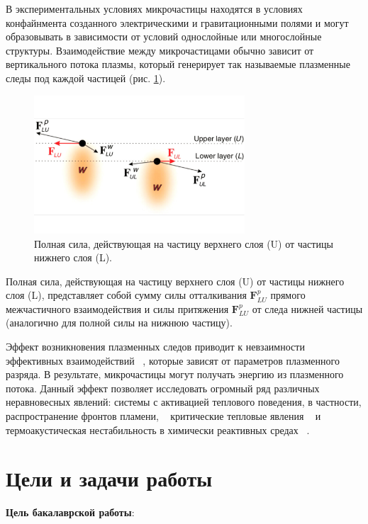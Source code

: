 В экспериментальных условиях микрочастицы находятся в условиях конфайнмента
созданного электрическими и гравитационными полями и могут
образовывать в зависимости от условий однослойные или многослойные структуры.
Взаимодействие между микрочастицами обычно зависит от вертикального
потока плазмы, который генерирует так называемые плазменные следы под каждой частицей (рис. \ref{NonRec}).

\begin{figure}[htbp]
\begin{center}
\includegraphics[width=0.7\textwidth]{Ris/wakes2.pdf}
\caption{ Полная сила, действующая на частицу верхнего слоя (U) от частицы нижнего слоя (L).}
\label{NonRec}
\end{center}
\end{figure}


Полная сила, действующая на частицу верхнего слоя (U) от частицы нижнего слоя (L), представляет собой сумму силы отталкивания $\textbf{F}^p_{LU}$ прямого межчастичного взаимодействия и силы притяжения $\textbf{F}^p_{LU}$ от следа нижней частицы (аналогично для полной силы на нижнюю частицу). 

Эффект возникновения плазменных следов приводит к невзаимности
эффективных взаимодействий ~\cite{PhysRevLett.83.3194}, которые зависят от параметров плазменного разряда. В результате, микрочастицы могут получать энергию из плазменного
потока. Данный эффект позволяет исследовать огромный ряд различных
неравновесных явлений: системы с активацией теплового поведения,
в частности, распространение фронтов пламени, ~\cite{PhysRevE.96.043201} критические тепловые
явления ~\cite{PhysRevE.97.043206} и термоакустическая нестабильность в химически реактивных
средах ~\cite{PhysRevLett.121.075003}.


\section{Цели и задачи работы}

\textbf{Цель бакалаврской работы}: 

